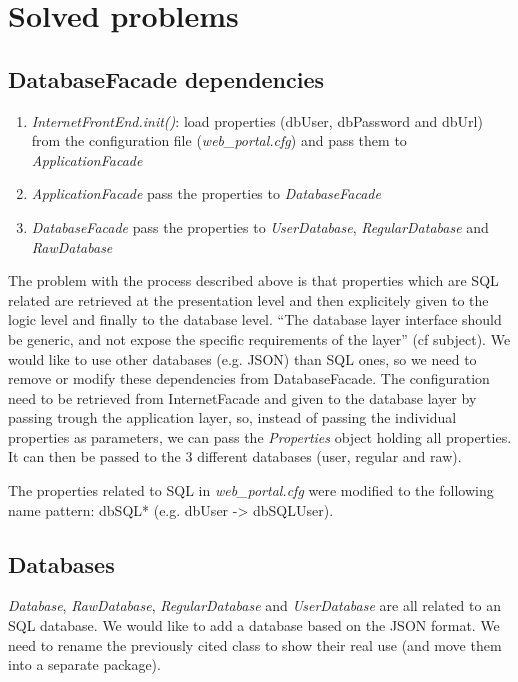 \section{Solved problems}
\subsection{DatabaseFacade dependencies}

\begin{enumerate}
\item \emph{InternetFrontEnd.init()}: load properties (dbUser, dbPassword and
    dbUrl) from the configuration file (\emph{web\_portal.cfg}) and pass them to
    \emph{ApplicationFacade}
    
\item \emph{ApplicationFacade} pass the properties to \emph{DatabaseFacade}

\item \emph{DatabaseFacade} pass the properties to \emph{UserDatabase},
    \emph{RegularDatabase} and \emph{RawDatabase}
\end{enumerate}

The problem with the process described above is that properties which are SQL
related are retrieved at the presentation level and then explicitely given to
the logic level and finally to the database level. ``The database layer
interface should be generic, and not expose the specific requirements of the
layer'' (cf subject).
We would like to use other databases (e.g. JSON) than SQL ones, so we need to
remove or modify these dependencies from DatabaseFacade. The configuration need
to be retrieved from InternetFacade and given to the database layer by passing
trough the application layer, so, instead of passing the individual properties
as parameters, we can pass the \emph{Properties} object holding all properties.
It can then be passed to the 3 different databases (user, regular and raw).

The properties related to SQL in \emph{web\_portal.cfg} were modified to the
following name pattern: dbSQL* (e.g. dbUser -> dbSQLUser).
\newpage

\subsection{Databases}

\emph{Database}, \emph{RawDatabase}, \emph{RegularDatabase} and
\emph{UserDatabase} are all related to an SQL database. We would like to
add a database based on the JSON format. We need to rename the
previously cited class to show their real use (and move them into a
separate package).


